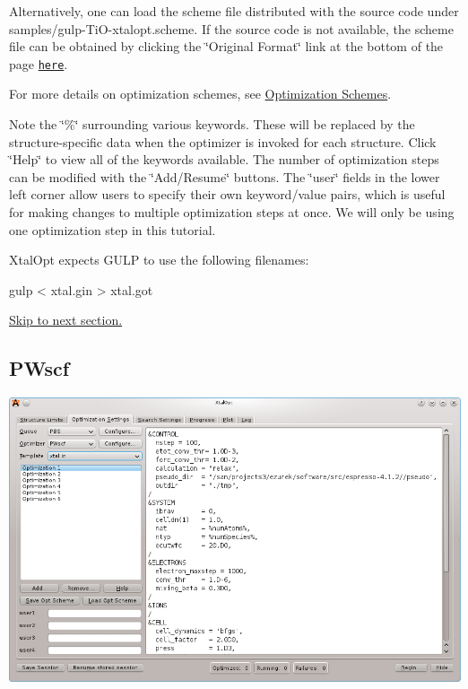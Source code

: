 Alternatively, one can load the scheme file distributed with the source code under samples/gulp-\/\+Ti\+O-\/xtalopt.\+scheme. If the source code is not available, the scheme file can be obtained by clicking the \char`\"{}\+Original Format\char`\"{} link at the bottom of the page \href{http://xtalopt.openmolecules.net/wiki/index.fcgi/browser/samples/gulp-TiO-xtalopt.scheme}{\tt here}.

For more details on optimization schemes, see \hyperlink{optschemes}{Optimization Schemes}.

Note the \char`\"{}\%\char`\"{} surrounding various keywords. These will be replaced by the structure-\/specific data when the optimizer is invoked for each structure. Click \char`\"{}\+Help\char`\"{} to view all of the keywords available. The number of optimization steps can be modified with the \char`\"{}\+Add/\+Resume\char`\"{} buttons. The \char`\"{}user\char`\"{} fields in the lower left corner allow users to specify their own keyword/value pairs, which is useful for making changes to multiple optimization steps at once. We will only be using one optimization step in this tutorial.

Xtal\+Opt expects G\+U\+L\+P to use the following filenames\+:


\begin{DoxyCode}
gulp < xtal.gin > xtal.got
\end{DoxyCode}


\hyperlink{tut-xo_qisetup}{Skip to next section.}\hypertarget{tut-xo_pwscf-opt}{}\subsection{P\+Wscf}\label{tut-xo_pwscf-opt}
 
\begin{DoxyImageNoCaption}
  \mbox{\includegraphics[width=\textwidth]{opt-set-pwscf.png}}
\end{DoxyImageNoCaption}



